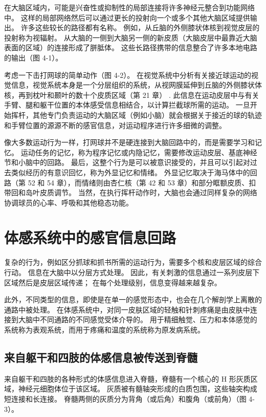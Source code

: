 在大脑区域内，可能是兴奋性或抑制性的局部连接将许多神经元整合到功能网络中。 这样的局部网络然后可以通过更长的投射向一个或多个其他大脑区域提供输出。 许多这些较长的路径都有名称。 例如，从丘脑的外侧膝状体核到视觉皮层的投射称为视辐射。 从大脑的一侧到大脑另一侧的新皮质（大脑皮层中最靠近大脑表面的区域）的连接形成了胼胝体。 这些长路径携带的信息整合了许多本地电路的输出（图 4-1）。

考虑一下击打网球的简单动作（图 4-2）。 在视觉系统中分析有关接近球运动的视觉信息，视觉系统本身是一个分层组织的系统，从视网膜延伸到丘脑的外侧膝状体核，再到枕叶和颞叶的数十个皮质区域（第 21 章） . 此信息在运动皮层中与有关手臂、腿和躯干位置的本体感受信息相结合，以计算拦截球所需的运动。 一旦开始挥杆，其他专门负责运动的大脑区域（例如小脑）就会根据关于接近的球的轨迹和手臂位置的源源不断的感官信息，对运动程序进行许多细微的调整。

像大多数运动行为一样，打网球并不是硬连接到大脑回路中的，而是需要学习和记忆。 运动任务的记忆，称为程序记忆或内隐记忆，需要修改运动皮层、基底神经节和小脑中的回路。 最后，这整个行为是可以被意识接受的，并且可以引起对过去类似经历的有意识回忆，称为外显记忆和情绪。 外显记忆取决于海马体中的回路（第 52 和 54 章），而情绪则由杏仁核（第 42 和 53 章）和部分眶额皮质、扣带回和岛叶皮质调节。 当然，在执行挥杆动作时，大脑也会通过同样复杂的网络协调球员的心率、呼吸和其他稳态功能。



\section{体感系统中的感官信息回路}
复杂的行为，例如区分抓球和抓书所需的运动行为，需要多个核和皮层区域的综合行动。 信息在大脑中以分层方式处理。 因此，有关刺激的信息通过一系列皮层下区域然后是皮层区域传递； 在每个处理级别，信息变得越来越复杂。

此外，不同类型的信息，即使是在单一的感觉形态中，也会在几个解剖学上离散的通路中被处理。 在体感系统中，对同一皮肤区域的轻触和针刺疼痛是由皮肤中连接到大脑中不同通路的不同感觉受体介导的。 用于精细触觉、压力和本体感觉的系统称为表观系统，而用于疼痛和温度的系统称为原发病系统。


\subsection{来自躯干和四肢的体感信息被传送到脊髓}
来自躯干和四肢的各种形式的体感信息进入脊髓，脊髓有一个核心的 H 形灰质区域，神经元细胞体位于该区域。 灰质被有髓轴突形成的白质包围，这些轴突构成短连接和长连接。 脊髓两侧的灰质分为背角（或后角）和腹角（或前角）（图 4-3）。

